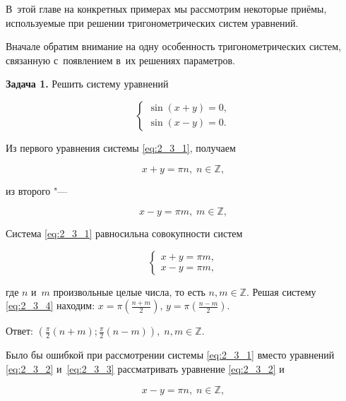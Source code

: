 
В~этой главе на конкретных примерах мы рассмотрим некоторые приёмы,
используемые при решении тригонометрических систем уравнений.

Вначале обратим внимание на одну особенность тригонометрических систем,
связанную с~появлением в~их решениях параметров.

\textbf{Задача 1.}\label{ex:2_3_1} Решить систему уравнений

\begin{equation}\label{eq:2_3_1}
\begin{cases}
\sin (x + y) = 0, \\
\sin (x - y) = 0.
\end{cases}
\end{equation}

Из первого уравнения системы \eqref{eq:2_3_1}, получаем

\begin{equation}\label{eq:2_3_2}
x + y = \pi n, \; n \in \mathbb{Z},
\end{equation}

\noindent
из второго "---

\begin{equation}\label{eq:2_3_3}
x - y = \pi m, \; m \in \mathbb{Z},
\end{equation}

\noindent
Система \eqref{eq:2_3_1} равносильна совокупности систем

\begin{equation}\label{eq:2_3_4}
\begin{cases}
x + y = \pi m, \\
x - y = \pi m,
\end{cases}
\end{equation}

\noindent
где $n$ и~$m$ произвольные целые числа, то есть $n, m \in \mathbb{Z}$.
Решая систему \eqref{eq:2_3_4} находим: 
$\displaystyle x = \pi \left( \frac{n + m}{2} \right)$,
$\displaystyle y = \pi \left( \frac{n - m}{2} \right)$.

Ответ:
$\displaystyle \left( \frac{\pi}{2}(n + m);
\frac{\pi}{2}(n - m) \right), \; n, m \in \mathbb{Z}$.

Было бы ошибкой при рассмотрении системы \eqref{eq:2_3_1} вместо уравнений
\eqref{eq:2_3_2} и~\eqref{eq:2_3_3} рассматривать уравнение \eqref{eq:2_3_2} и

\begin{equation}\label{eq:2_3_3-1}
x - y = \pi n, \; n \in \mathbb{Z},
\end{equation}

